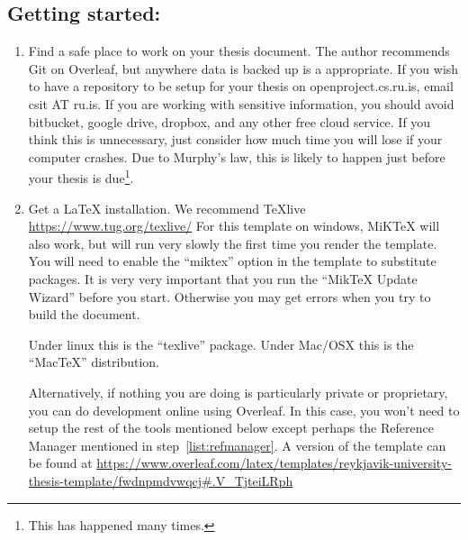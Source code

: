 \subsection{Getting started:}
\begin{enumerate}
\item Find a safe place to work on your thesis document.
  The author recommends Git on Overleaf, but anywhere data is backed up is a appropriate.
  If you wish to have a repository to be setup for your thesis on openproject.cs.ru.is, email csit AT ru.is.  
  If you are working with sensitive information, you should avoid bitbucket, google drive, dropbox, and any other free cloud service.
  If you think this is unnecessary, just consider how much time you will lose if your computer crashes.
   Due to Murphy's law, this is likely to happen just before your thesis is due\footnote{This has happened many times.}.

 \item Get a LaTeX installation.  We recommend TeXlive \url{https://www.tug.org/texlive/}
   For this template on windows, MiKTeX will also work, but will run very slowly the first time you render the template.
   You will need to enable the ``miktex'' option in the template to substitute packages.
   It is very very important that you run the ``MikTeX Update Wizard'' before you start.
   Otherwise you may get errors when you try to build the document.

   Under linux this is the ``texlive'' package.
   Under Mac/OSX this is the ``MacTeX'' distribution.

   Alternatively, if nothing you are doing is particularly private or proprietary, you can do development online using Overleaf.
   In this case, you won't need to setup the rest of the tools mentioned below except perhaps the Reference Manager mentioned in step~\ref{list:refmanager}.
   A version of the template can be found at \url{https://www.overleaf.com/latex/templates/reykjavik-university-thesis-template/fwdnpmdvwqcj#.V_TjteiLRph}
   


\end{enumerate}
